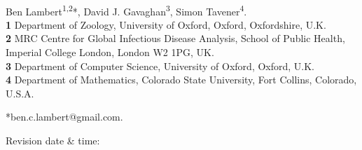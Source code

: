\documentclass[10pt,letterpaper]{article}
\begin{document}
\vspace*{0.2in}

\begin{flushleft}
{\Large
\textbf{}
}
\newline
\\
Ben Lambert\textsuperscript{1,2}*,
David J. Gavaghan\textsuperscript{3},
Simon Tavener\textsuperscript{4}.
\\
\bigskip
\textbf{1} Department of Zoology, University of Oxford, Oxford, Oxfordshire, U.K.
\\
\textbf{2} MRC Centre for Global Infectious Disease Analysis, School of Public Health, Imperial College London, London W2 1PG, UK.
\\
\textbf{3} Department of Computer Science, University of Oxford, Oxford, U.K.
\\
\textbf{4} Department of Mathematics, Colorado State University, Fort Collins, Colorado, U.S.A.
\\
\bigskip

*ben.c.lambert@gmail.com.

\end{flushleft}

\hfill Revision date \& time: \timestamp
\bigskip




\end{document}
